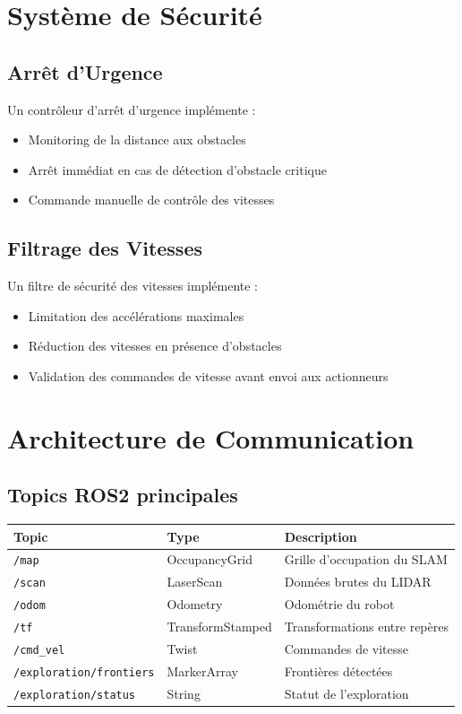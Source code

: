 \documentclass[12pt,a4paper,oneside]{report}
\begin{document}
\section{Système de Sécurité}

\subsection{Arrêt d'Urgence}

Un contrôleur d'arrêt d'urgence implémente :

\begin{itemize}
  \item Monitoring de la distance aux obstacles
  \item Arrêt immédiat en cas de détection d'obstacle critique
  \item Commande manuelle de contrôle des vitesses
\end{itemize}

\subsection{Filtrage des Vitesses}

Un filtre de sécurité des vitesses implémente :

\begin{itemize}
  \item Limitation des accélérations maximales
  \item Réduction des vitesses en présence d'obstacles
  \item Validation des commandes de vitesse avant envoi aux actionneurs
\end{itemize}

\section{Architecture de Communication}

\subsection{Topics ROS2 principales}

\begin{table}[H]
\centering
\begin{tabular}{|l|l|l|}
\hline
\textbf{Topic} & \textbf{Type} & \textbf{Description} \\
\hline
\texttt{/map} & OccupancyGrid & Grille d'occupation du SLAM \\
\texttt{/scan} & LaserScan & Données brutes du LIDAR \\
\texttt{/odom} & Odometry & Odométrie du robot \\
\texttt{/tf} & TransformStamped & Transformations entre repères \\
\texttt{/cmd\_vel} & Twist & Commandes de vitesse \\
\texttt{/exploration/frontiers} & MarkerArray & Frontières détectées \\
\texttt{/exploration/status} & String & Statut de l'exploration \\
\hline
\end{tabular}
\end{table}
\end{document}
